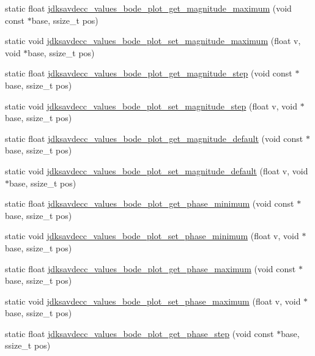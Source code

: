\begin{DoxyCompactItemize}
\item 
static float \hyperlink{group__values__bode__plot_ga1b3dc7057b2019b21f22d8ff79fc830c}{jdksavdecc\+\_\+values\+\_\+bode\+\_\+plot\+\_\+get\+\_\+magnitude\+\_\+maximum} (void const $\ast$base, ssize\+\_\+t pos)
\item 
static void \hyperlink{group__values__bode__plot_ga2ea51d8f5b19b166a4545983d34b3817}{jdksavdecc\+\_\+values\+\_\+bode\+\_\+plot\+\_\+set\+\_\+magnitude\+\_\+maximum} (float v, void $\ast$base, ssize\+\_\+t pos)
\item 
static float \hyperlink{group__values__bode__plot_ga61030f44a4b7b614f42f5faf830eed66}{jdksavdecc\+\_\+values\+\_\+bode\+\_\+plot\+\_\+get\+\_\+magnitude\+\_\+step} (void const $\ast$base, ssize\+\_\+t pos)
\item 
static void \hyperlink{group__values__bode__plot_gaf192bb04397acd675322776e689ec4c3}{jdksavdecc\+\_\+values\+\_\+bode\+\_\+plot\+\_\+set\+\_\+magnitude\+\_\+step} (float v, void $\ast$base, ssize\+\_\+t pos)
\item 
static float \hyperlink{group__values__bode__plot_gac495e0f41eac0af578ed2521774fb1e9}{jdksavdecc\+\_\+values\+\_\+bode\+\_\+plot\+\_\+get\+\_\+magnitude\+\_\+default} (void const $\ast$base, ssize\+\_\+t pos)
\item 
static void \hyperlink{group__values__bode__plot_ga1aa5ce64fcadaa768c1dcea8416ea9c3}{jdksavdecc\+\_\+values\+\_\+bode\+\_\+plot\+\_\+set\+\_\+magnitude\+\_\+default} (float v, void $\ast$base, ssize\+\_\+t pos)
\item 
static float \hyperlink{group__values__bode__plot_ga1f403fc5554e1111c3a29e17329d65ee}{jdksavdecc\+\_\+values\+\_\+bode\+\_\+plot\+\_\+get\+\_\+phase\+\_\+minimum} (void const $\ast$base, ssize\+\_\+t pos)
\item 
static void \hyperlink{group__values__bode__plot_gad90dab1d353147991550ca5d685d99ac}{jdksavdecc\+\_\+values\+\_\+bode\+\_\+plot\+\_\+set\+\_\+phase\+\_\+minimum} (float v, void $\ast$base, ssize\+\_\+t pos)
\item 
static float \hyperlink{group__values__bode__plot_ga42e4ab45e4b3ad676174f57d4dbd1c89}{jdksavdecc\+\_\+values\+\_\+bode\+\_\+plot\+\_\+get\+\_\+phase\+\_\+maximum} (void const $\ast$base, ssize\+\_\+t pos)
\item 
static void \hyperlink{group__values__bode__plot_ga5283a631c338c004c3e31c2ef3ffd9e0}{jdksavdecc\+\_\+values\+\_\+bode\+\_\+plot\+\_\+set\+\_\+phase\+\_\+maximum} (float v, void $\ast$base, ssize\+\_\+t pos)
\item 
static float \hyperlink{group__values__bode__plot_ga824e85667783e7331832dd4163acb9a3}{jdksavdecc\+\_\+values\+\_\+bode\+\_\+plot\+\_\+get\+\_\+phase\+\_\+step} (void const $\ast$base, ssize\+\_\+t pos)

\end{DoxyCompactItemize}
